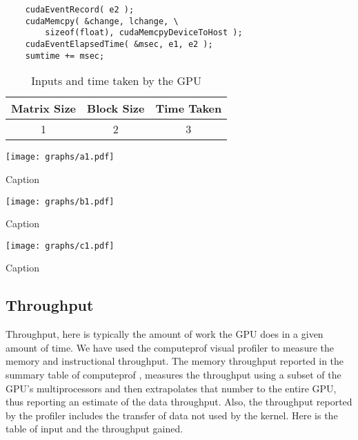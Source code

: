 \documentclass[10pt]{article}
\makeatletter
\newenvironment{figurehere}
    {\def\@captype{figure}}
    {}
\makeatother
\begin{document}
\begin{multicols}{2}
\begin{enumerate}
    \begin{verbatim}
    cudaEventRecord( e2 );
    cudaMemcpy( &change, lchange, \
        sizeof(float), cudaMemcpyDeviceToHost );
    cudaEventElapsedTime( &msec, e1, e2 );
    sumtime += msec;
    \end{verbatim}

    \end{enumerate}

    \begin{table}\footnotesize
    \centering
        \begin{tabular}{ | c | c | c | }
        \hline
        Matrix Size & Block Size & Time Taken \\
        \hline
        1 & 2 & 3 \\
        \hline
        \end{tabular}
        \caption{Inputs and time taken by the GPU}
        \label{tab:inputs_time_taken}
    \end{table}

    \begin{center}
    \begin{figurehere}
        \texttt{[image: graphs/a1.pdf]}
        \caption{Caption}
        \label{fig:time_taken1}
    \end{figurehere}
    \end{center}
    
    \begin{center}
    \begin{figurehere}
        \texttt{[image: graphs/b1.pdf]}
        \caption{Caption}
        \label{fig:time_taken2}
    \end{figurehere}
    \end{center}

    \begin{center}
    \begin{figurehere}
        \texttt{[image: graphs/c1.pdf]}
        \caption{Caption}
        \label{fig:time_taken3}
    \end{figurehere}
    \end{center}

    \subsection{Throughput}
    Throughput, here is typically the amount of work the GPU does in a given amount of time.
    We have used the computeprof visual profiler to measure the memory and instructional throughput.
    The memory throughput reported in the summary table of computeprof ,  measures  the throughput using a subset of the GPU’s multiprocessors and then extrapolates that number to the entire GPU, thus reporting an estimate of the data throughput.
    Also, the throughput reported by the profiler includes the transfer of data not used by the kernel.
    Here is the table of input and the throughput gained.


\end{multicols}
\end{document}
